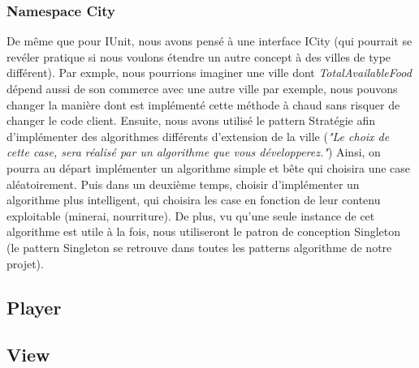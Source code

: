 		\subsubsection{Namespace City}
			De même que pour IUnit, nous avons pensé à une interface ICity (qui pourrait se revéler pratique si nous voulons étendre un autre concept à des villes de type différent).
		Par exmple, nous pourrions imaginer une ville dont \textit{TotalAvailableFood} dépend aussi de son commerce avec une autre ville par exemple, nous pouvons changer la manière dont est implémenté cette méthode à chaud sans risquer de changer le code client.
			Ensuite, nous avons utilisé le pattern Stratégie afin d'implémenter des algorithmes différents d'extension de la ville (\textit{"Le choix de cette case, sera réalisé par un algorithme que vous développerez."})
		Ainsi, on pourra au départ implémenter un algorithme simple et bête qui choisira une case aléatoirement.
			Puis dans un deuxième temps, choisir d'implémenter un algorithme plus intelligent, qui choisira les case en fonction de leur contenu exploitable (minerai, nourriture).
		De plus, vu qu'une seule instance de cet algorithme est utile à la fois, nous utiliseront le patron de conception Singleton (le pattern Singleton se retrouve dans toutes les patterns algorithme de notre projet).
			
		
	\subsection{Player}
	\subsection{View}
